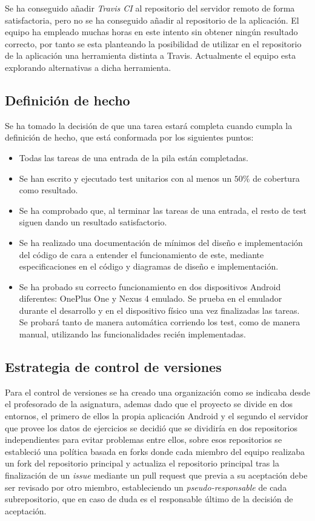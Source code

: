 \documentclass[11pt,a4paper]{report}
\begin{document}
Se ha conseguido añadir \textit{Travis CI} al repositorio del servidor remoto de forma satisfactoria, pero no se ha conseguido añadir al repositorio de la aplicación. El equipo ha empleado muchas horas en este intento sin obtener ningún resultado correcto, por tanto se esta planteando la posibilidad de utilizar en el repositorio de la aplicación una herramienta distinta a Travis. Actualmente el equipo esta explorando alternativas a dicha herramienta.
\subsection{Definición de hecho}
Se ha tomado la decisión de que una tarea estará completa cuando cumpla la definición de hecho, que está conformada por los siguientes puntos:
\begin{itemize}
	\item Todas las tareas de una entrada de la pila están completadas.
	\item Se han escrito y ejecutado test unitarios con al menos un $50\%$ de cobertura como resultado.
	\item Se ha comprobado que, al terminar las tareas de una entrada, el resto de test siguen dando un resultado satisfactorio.
	\item Se ha realizado una documentación de mínimos del diseño e implementación del código de cara a entender el funcionamiento de este, mediante especificaciones en el código y diagramas de diseño e implementación.
	\item Se ha probado su correcto funcionamiento en dos dispositivos Android diferentes: OnePlus One y Nexus 4 emulado. Se prueba en el emulador durante el desarrollo y en el dispositivo físico una vez finalizadas las tareas. Se probará tanto de manera automática corriendo los test, como de manera manual, utilizando las funcionalidades recién implementadas.
\end{itemize}
\subsection{Estrategia de control de versiones}
Para el control de versiones se ha creado una organización como se indicaba desde el profesorado de la asignatura, ademas dado que el proyecto se divide en dos entornos, el primero de ellos la propia aplicación Android y el segundo el servidor que provee los datos de ejercicios se decidió que se dividiría en dos repositorios independientes para evitar problemas entre ellos, sobre esos repositorios se estableció una política basada en forks donde cada miembro del equipo realizaba un fork del repositorio principal y actualiza el repositorio principal tras la finalización de un \textit{issue} mediante un pull request que previa a su aceptación debe ser revisado por otro miembro, estableciendo un \textit{pseudo-responsable} de cada subrepositorio, que en caso de duda es el responsable último de la decisión de aceptación.
\end{document}
